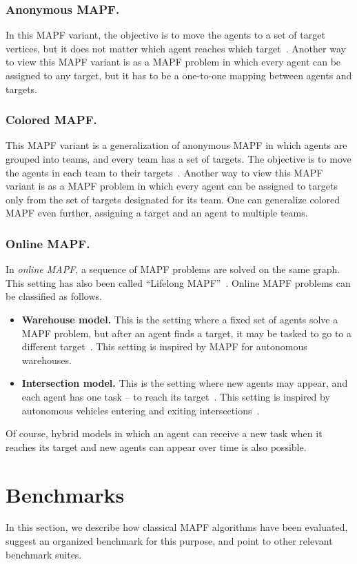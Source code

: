 \documentclass[letterpaper]{article} %
\newcommand{\mapf}{\ac{MAPF}\xspace}
\begin{document}
\subsubsection{Anonymous \mapf.}
In this \mapf variant, the objective is to move the agents to a set of target vertices, but it does not matter which agent reaches which target~\cite{kloder2006path,yu2013multi}.
Another way to view this \mapf variant is as a \mapf problem in which every agent can be assigned to any target, but it has to be a one-to-one mapping between agents and targets.
\subsubsection{Colored \mapf.}
This \mapf variant is a generalization of anonymous \mapf in which agents are grouped into teams, and every team has a set of targets. The objective is to move the agents in each team to their targets~\cite{ma2016optimal,solovey2014k}. Another way to view this \mapf variant is as a \mapf problem in which every agent can be assigned to targets only from the set of targets designated for its team.
One can generalize colored \mapf even further, assigning a target and an agent to multiple teams.
\subsubsection{Online MAPF.}
In \emph{online \mapf}, a sequence of \mapf problems are solved on the same graph. This setting has also been called ``Lifelong MAPF''~\cite{MaAAMAS17,MaAAAI19b}. Online \mapf problems can be classified as follows.
\begin{itemize}
    \item \textbf{Warehouse model.} This is the setting where a fixed set of agents solve a \mapf problem, but after an agent finds a target, it may be tasked to go to a different target~\cite{MaAAAI19b}. This setting is inspired by \mapf for autonomous warehouses.
    \item \textbf{Intersection model.} This is the setting where new agents may appear, and each agent has one task -- to reach its target~\cite{svancara2019online}. This setting is inspired by autonomous vehicles entering and exiting intersections~\cite{dresner2008multiagent}.
\end{itemize}
Of course, hybrid models in which an agent can receive a new task when it reaches its target and new agents can appear over time is also possible.
\section{Benchmarks}
In this section, we describe how classical \mapf algorithms have been evaluated, suggest an organized benchmark for this purpose, and point to other relevant benchmark suites.
\end{document}
